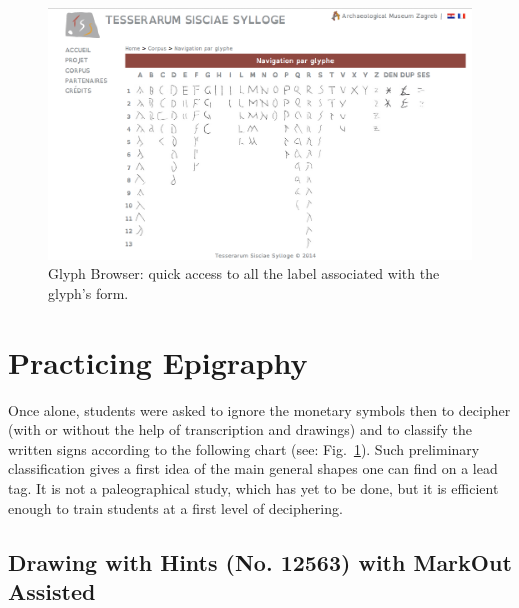 \documentclass[amsthm,ebook]{saparticle}
\begin{document}
\begin{figure}[!htp]
\centering
\includegraphics[width=\columnwidth]{4_glyphs.png}
\caption{Glyph Browser: quick access to all the label associated with the glyph's form.}
\label{fig:table1}
\end{figure}

\section{Practicing Epigraphy}

\noindent Once alone, students were asked to ignore the monetary symbols then to decipher (with or without the help of
transcription and drawings) and to classify the written signs according to the following chart (see: Fig.~\ref{fig:table1}). Such preliminary
classification gives a first idea of the main general shapes one can find on a lead tag. It is not a paleographical
study, which has yet to be done, but it is efficient enough to train students at a first level of deciphering.





\subsection{Drawing with Hints (No. 12563) with MarkOut Assisted}
\end{document}
